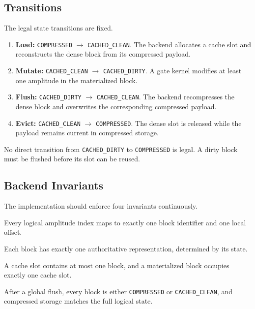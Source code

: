\documentclass[runningheads]{llncs}
\begin{document}
\subsection{Transitions}

The legal state transitions are fixed.
\begin{enumerate}[leftmargin=1.5em]
  \item \textbf{Load:} \texttt{COMPRESSED} $\rightarrow$ \texttt{CACHED\_CLEAN}. The backend allocates a cache slot and reconstructs the dense block from its compressed payload.
  \item \textbf{Mutate:} \texttt{CACHED\_CLEAN} $\rightarrow$ \texttt{CACHED\_DIRTY}. A gate kernel modifies at least one amplitude in the materialized block.
  \item \textbf{Flush:} \texttt{CACHED\_DIRTY} $\rightarrow$ \texttt{CACHED\_CLEAN}. The backend recompresses the dense block and overwrites the corresponding compressed payload.
  \item \textbf{Evict:} \texttt{CACHED\_CLEAN} $\rightarrow$ \texttt{COMPRESSED}. The dense slot is released while the payload remains current in compressed storage.
\end{enumerate}

No direct transition from \texttt{CACHED\_DIRTY} to \texttt{COMPRESSED} is legal. A dirty block must be flushed before its slot can be reused.

\subsection{Backend Invariants}

The implementation should enforce four invariants continuously.
\begin{description}[leftmargin=1.4em,style=nextline]
  \item[Index invariant.] Every logical amplitude index maps to exactly one block identifier and one local offset.
  \item[Authority invariant.] Each block has exactly one authoritative representation, determined by its state.
  \item[Cache-slot invariant.] A cache slot contains at most one block, and a materialized block occupies exactly one cache slot.
  \item[Flush invariant.] After a global flush, every block is either \texttt{COMPRESSED} or \texttt{CACHED\_CLEAN}, and compressed storage matches the full logical state.
\end{description}
\end{document}
